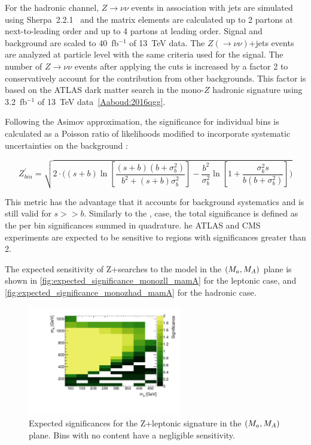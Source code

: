 For the hadronic channel, $Z \to \nu\nu$ events in association with jets are simulated using Sherpa~2.2.1~\cite{Gleisberg:2008ta} and the matrix elements are calculated up to 2 partons at next-to-leading order and up to 4 partons at leading order. Signal and background are scaled to 40~fb$^{-1}$ of 13~TeV data.
The $Z (\to \nu\nu)$+jets events are analyzed at particle level with the same criteria used for the signal. 
The number of $Z \to \nu\nu$ events after applying the cuts is increased by a factor 2 to conservatively account for the contribution from other backgrounds. 
This factor is based on the ATLAS dark matter search in the mono-$Z$ hadronic signature using 3.2~fb$^{-1}$ of 13~TeV data~\ref{Aaboud:2016qgg}. 

Following the Asimov approximation, the significance for individual bins is calculated as a Poisson ratio of likelihoods modified to incorporate systematic uncertainties on the background \cite{Cowan:2012}:  

\begin{equation}
\label{eq:significance_wsyst}
Z^\prime_{bin} = \sqrt{ 2 \cdot \bigg( (s+b) \ln[\frac{ (s+b) (b+\sigma_b^2) } {b^2 + (s+b) \sigma_b^2} ]- \frac{b^2}{\sigma_b^2} \ln[1 + \frac{\sigma_b^2 s}{b(b+\sigma_b^2)} ] \bigg) }
\end{equation}

This metric has the advantage that it accounts for background systematics and is still valid for $s >> b$.  
Similarly to the \monohbb, case, the total significance is defined as the per bin significances summed in quadrature.
 he ATLAS and CMS experiments are expected to be sensitive to regions with significances greater than 2.
 
The expected sensitivity of Z+\MET searches to the \hdma model in the $(M_{a},M_{A})$ plane is shown in \autoref{fig:expected_significance_monozll_mamA} for the leptonic case, and \autoref{fig:expected_significance_monozhad_mamA} for the hadronic case.

\begin{figure}
\centering
\includegraphics[width=0.6\textwidth]{texinputs/04_grid/figures/monoz/leptonic/mAma_Significance_ll.pdf}
\caption{Expected significances for the Z+\MET leptonic signature in the $(M_{a},M_{A})$ plane. Bins with no content have a negligible sensitivity.} 
\label{fig:expected_significance_monozll_mamA}
\end{figure}

